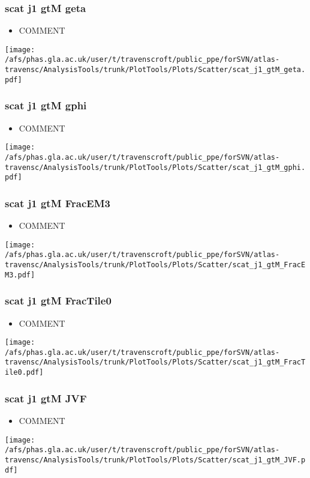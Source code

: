 \documentclass{beamer}
\begin{document}
\begin{frame}
\frametitle{scat j1 gtM geta}
\begin{itemize}
\item COMMENT
\end{itemize}
\begin{center}
\texttt{[image: /afs/phas.gla.ac.uk/user/t/travenscroft/public\_ppe/forSVN/atlas-travensc/AnalysisTools/trunk/PlotTools/Plots/Scatter/scat\_j1\_gtM\_geta.pdf]}
\end{center}
\end{frame}

\begin{frame}
\frametitle{scat j1 gtM gphi}
\begin{itemize}
\item COMMENT
\end{itemize}
\begin{center}
\texttt{[image: /afs/phas.gla.ac.uk/user/t/travenscroft/public\_ppe/forSVN/atlas-travensc/AnalysisTools/trunk/PlotTools/Plots/Scatter/scat\_j1\_gtM\_gphi.pdf]}
\end{center}
\end{frame}

\begin{frame}
\frametitle{scat j1 gtM FracEM3}
\begin{itemize}
\item COMMENT
\end{itemize}
\begin{center}
\texttt{[image: /afs/phas.gla.ac.uk/user/t/travenscroft/public\_ppe/forSVN/atlas-travensc/AnalysisTools/trunk/PlotTools/Plots/Scatter/scat\_j1\_gtM\_FracEM3.pdf]}
\end{center}
\end{frame}

\begin{frame}
\frametitle{scat j1 gtM FracTile0}
\begin{itemize}
\item COMMENT
\end{itemize}
\begin{center}
\texttt{[image: /afs/phas.gla.ac.uk/user/t/travenscroft/public\_ppe/forSVN/atlas-travensc/AnalysisTools/trunk/PlotTools/Plots/Scatter/scat\_j1\_gtM\_FracTile0.pdf]}
\end{center}
\end{frame}

\begin{frame}
\frametitle{scat j1 gtM JVF}
\begin{itemize}
\item COMMENT
\end{itemize}
\begin{center}
\texttt{[image: /afs/phas.gla.ac.uk/user/t/travenscroft/public\_ppe/forSVN/atlas-travensc/AnalysisTools/trunk/PlotTools/Plots/Scatter/scat\_j1\_gtM\_JVF.pdf]}
\end{center}
\end{frame}
\end{document}
